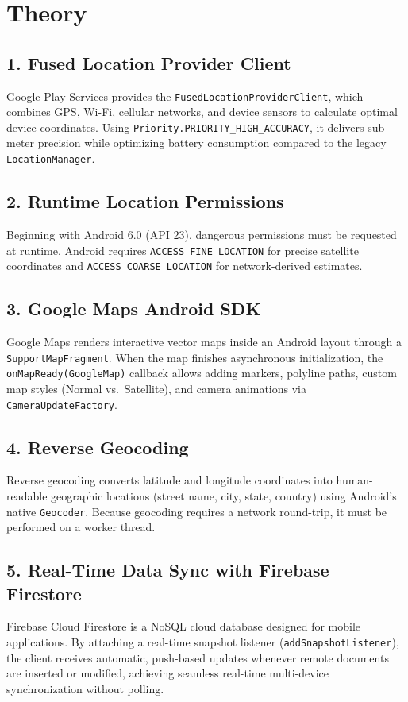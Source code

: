 \documentclass[12pt,a4paper]{article}
\begin{document}
\section*{Theory}

\subsection*{1. Fused Location Provider Client}
Google Play Services provides the \texttt{FusedLocationProviderClient}, which combines GPS, Wi-Fi, cellular networks, and device sensors to calculate optimal device coordinates. Using \texttt{Priority.PRIORITY\_HIGH\_ACCURACY}, it delivers sub-meter precision while optimizing battery consumption compared to the legacy \texttt{LocationManager}.

\subsection*{2. Runtime Location Permissions}
Beginning with Android 6.0 (API 23), dangerous permissions must be requested at runtime. Android requires \texttt{ACCESS\_FINE\_LOCATION} for precise satellite coordinates and \texttt{ACCESS\_COARSE\_LOCATION} for network-derived estimates.

\subsection*{3. Google Maps Android SDK}
Google Maps renders interactive vector maps inside an Android layout through a \texttt{SupportMapFragment}. When the map finishes asynchronous initialization, the \texttt{onMapReady(GoogleMap)} callback allows adding markers, polyline paths, custom map styles (Normal vs.\ Satellite), and camera animations via \texttt{CameraUpdateFactory}.

\subsection*{4. Reverse Geocoding}
Reverse geocoding converts latitude and longitude coordinates into human-readable geographic locations (street name, city, state, country) using Android's native \texttt{Geocoder}. Because geocoding requires a network round-trip, it must be performed on a worker thread.

\subsection*{5. Real-Time Data Sync with Firebase Firestore}
Firebase Cloud Firestore is a NoSQL cloud database designed for mobile applications. By attaching a real-time snapshot listener (\texttt{addSnapshotListener}), the client receives automatic, push-based updates whenever remote documents are inserted or modified, achieving seamless real-time multi-device synchronization without polling.
\end{document}
